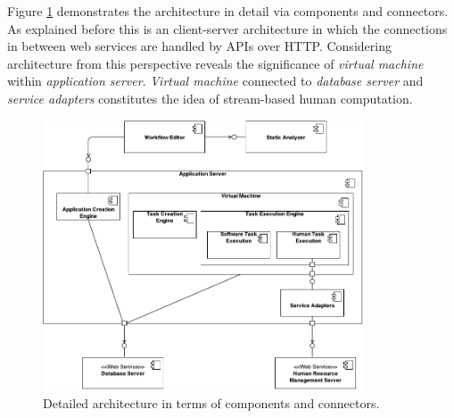 Figure \ref{fig:componentconnector} demonstrates the architecture in detail 
via components and connectors. As explained before this is an client-server 
architecture in which the connections in between web services are handled 
by APIs over HTTP. Considering architecture from this perspective reveals the 
significance of \textit{virtual machine} within \textit{application server}. 
\textit{Virtual machine} connected to \textit{database server} and 
\textit{service adapters} constitutes the idea of stream-based human computation.

\begin{figure}[ht]
	\centering
	\includegraphics[width=0.85\textwidth]{figures/architecture/ComponentConnector.pdf}
	\caption{Detailed architecture in terms of components and connectors.}
	\label{fig:componentconnector}
\end{figure}

